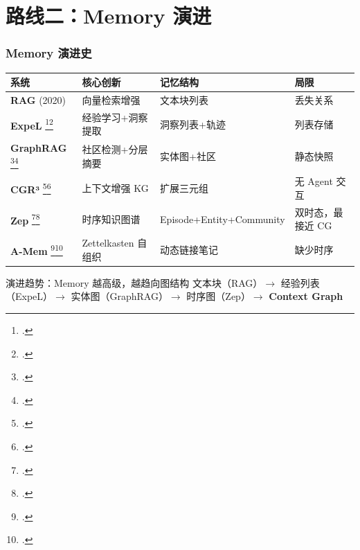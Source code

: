 \documentclass[aspectratio=169,10pt]{beamer}
\let\oldcite\cite
\renewcommand{\cite}[1]{\oldcite{#1}\footcitetext{#1}}
\begin{document}
\section{路线二：Memory 演进}

\begin{frame}
  \frametitle{Memory 演进史}

  \scriptsize
  \renewcommand{\arraystretch}{1.3}
  \centering
  \begin{tabular}{>{\centering}p{2.2cm}|p{3cm}|p{2.5cm}|p{3cm}}
    \textbf{系统} & \textbf{核心创新} & \textbf{记忆结构} & \textbf{局限} \\
    \hline
    \textbf{RAG} (2020) & 向量检索增强 & 文本块列表 & 丢失关系 \\
    \hline
    \textbf{ExpeL} \cite{zhao2024expel} & 经验学习+洞察提取 & 洞察列表+轨迹 & 列表存储 \\
    \hline
    \textbf{GraphRAG} \cite{microsoft2024graphrag} & 社区检测+分层摘要 & 实体图+社区 & 静态快照 \\
    \hline
    \textbf{CGR³} \cite{xu2024cgr3} & 上下文增强 KG & 扩展三元组 & 无 Agent 交互 \\
    \hline
    \textbf{Zep} \cite{rasmussen2025zep} & 时序知识图谱 & Episode+Entity+Community & 双时态，最接近 CG \\
    \hline
    \textbf{A-Mem} \cite{xu2025amem} & Zettelkasten 自组织 & 动态链接笔记 & 缺少时序 \\
  \end{tabular}

  \vspace{0.3cm}

  \begin{alertblock}{演进趋势：Memory 越高级，越趋向图结构}
    文本块（RAG）$\rightarrow$ 经验列表（ExpeL）$\rightarrow$ 实体图（GraphRAG）$\rightarrow$ 时序图（Zep）$\rightarrow$ \textbf{Context Graph}
  \end{alertblock}
\end{frame}
\end{document}
